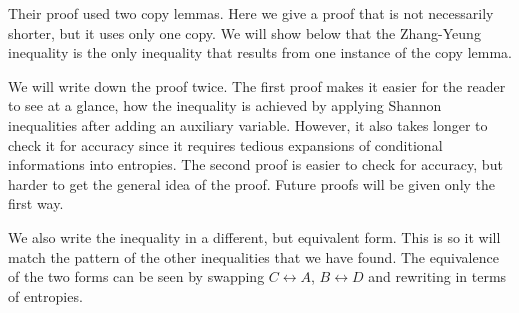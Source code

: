 \documentclass[10pt,journal]{IEEEtran}
\begin{document}
Their proof used two copy lemmas.  Here we give
a proof that is not necessarily shorter, but it uses only one copy.
We will show below that the Zhang-Yeung inequality is the only inequality that
results from one instance of the copy lemma.

We will write down the proof twice.  The first proof makes it easier for the reader to
see at a glance, how the inequality is achieved by applying Shannon inequalities after adding an auxiliary variable.
However, it also takes longer to check it for accuracy since it requires tedious expansions of conditional informations
into entropies.  The second proof is easier to check for accuracy, but harder to get the general idea of the proof.
Future proofs will be given only the first way.

We also write the inequality
in a different, but equivalent form.  This is so it will match the pattern of the other inequalities
that we have found.  The equivalence of the two forms can be seen by swapping $C \leftrightarrow A$, $B \leftrightarrow  D$
and rewriting in terms of entropies.
\end{document}
